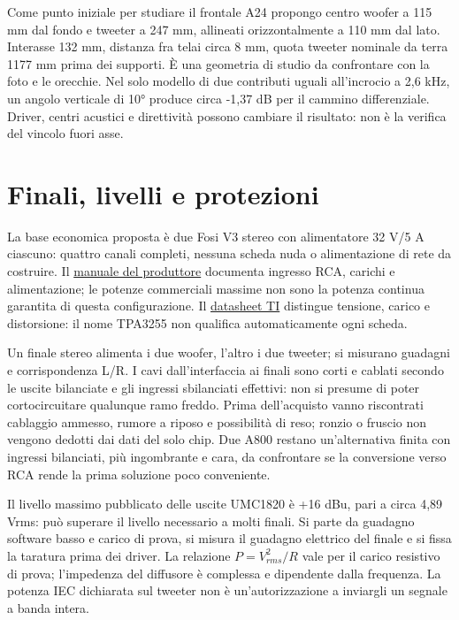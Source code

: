 \documentclass[
  italian,
  11pt,
  a4paper,
]{article}
\begin{document}
Come punto iniziale per studiare il frontale A24 propongo centro woofer a 115 mm dal fondo e
tweeter a 247 mm, allineati orizzontalmente a 110 mm dal lato. Interasse 132 mm, distanza
fra telai circa 8 mm, quota tweeter nominale da terra 1177 mm prima dei supporti. È una
geometria di studio da confrontare con la foto e le orecchie. Nel solo modello di due
contributi uguali all'incrocio a 2,6 kHz, un angolo verticale di 10° produce circa -1,37 dB
per il cammino differenziale. Driver, centri acustici e direttività possono cambiare il
risultato: non è la verifica del vincolo fuori asse.

\section{Finali, livelli e protezioni}\label{finali-livelli-e-protezioni}

La base economica proposta è due Fosi V3 stereo con alimentatore 32 V/5 A ciascuno: quattro
canali completi, nessuna scheda nuda o alimentazione di rete da costruire. Il
\href{https://fosiaudio.com/pages/user-instruction-v3}{manuale del produttore} documenta
ingresso RCA, carichi e alimentazione; le potenze commerciali massime non sono la potenza
continua garantita di questa configurazione. Il
\href{https://www.ti.com/lit/ds/symlink/tpa3255.pdf}{datasheet TI} distingue tensione,
carico e distorsione: il nome TPA3255 non qualifica automaticamente ogni scheda.

Un finale stereo alimenta i due woofer, l'altro i due tweeter; si misurano guadagni e
corrispondenza L/R. I cavi dall'interfaccia ai finali sono corti e cablati secondo le uscite
bilanciate e gli ingressi sbilanciati effettivi: non si presume di poter cortocircuitare
qualunque ramo freddo. Prima dell'acquisto vanno riscontrati cablaggio ammesso, rumore a
riposo e possibilità di reso; ronzio o fruscio non vengono dedotti dai dati del solo chip.
Due A800 restano un'alternativa finita con ingressi bilanciati, più ingombrante e cara, da
confrontare se la conversione verso RCA rende la prima soluzione poco conveniente.

Il livello massimo pubblicato delle uscite UMC1820 è +16 dBu, pari a circa 4,89 Vrms: può
superare il livello necessario a molti finali. Si parte da guadagno software basso e carico
di prova, si misura il guadagno elettrico del finale e si fissa la taratura prima dei
driver. La relazione \(P=V_{rms}^2/R\) vale per il carico resistivo di prova; l'impedenza
del diffusore è complessa e dipendente dalla frequenza. La potenza IEC dichiarata sul
tweeter non è un'autorizzazione a inviargli un segnale a banda intera.
\end{document}
